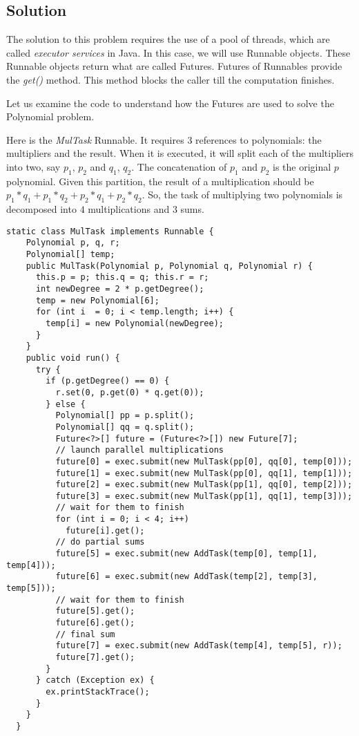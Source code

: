 \subsection{Solution}
\par
The solution to this problem requires the use of a pool of threads, which are
called \textit{executor services} in Java.  In this case, we will use Runnable
objects. These Runnable objects return what are called Futures. Futures of
Runnables provide the \textit{get()} method. This method blocks the caller till
the computation finishes. 
\par
Let us examine the code to understand how the Futures are used to solve the
Polynomial problem.
\par
Here is the \textit{MulTask} Runnable. It requires 3 references to polynomials:
the multipliers and the result. When it is executed, it will split each of the
multipliers into two, say $p_1$, $p_2$ and $q_1$, $q_2$. The concatenation of
$p_1$ and $p_2$ is the original $p$ polynomial. Given this partition, the result
of a multiplication should be $p_1*q_1 + p_1*q_2 + p_2*q_1 + p_2*q_2$. So, the
task of multiplying two polynomials is decomposed into $4$ multiplications and
$3$ sums. 
\par
\hfill
\begin{lstlisting}[style=numbers]
  static class MulTask implements Runnable {
    Polynomial p, q, r;
    Polynomial[] temp;
    public MulTask(Polynomial p, Polynomial q, Polynomial r) {
      this.p = p; this.q = q; this.r = r;
      int newDegree = 2 * p.getDegree();
      temp = new Polynomial[6];
      for (int i  = 0; i < temp.length; i++) {
        temp[i] = new Polynomial(newDegree);
      }
    }
    public void run() {
      try {
        if (p.getDegree() == 0) {
          r.set(0, p.get(0) * q.get(0));
        } else {
          Polynomial[] pp = p.split();
          Polynomial[] qq = q.split();
          Future<?>[] future = (Future<?>[]) new Future[7];
          // launch parallel multiplications
          future[0] = exec.submit(new MulTask(pp[0], qq[0], temp[0]));
          future[1] = exec.submit(new MulTask(pp[0], qq[1], temp[1]));
          future[2] = exec.submit(new MulTask(pp[1], qq[0], temp[2]));
          future[3] = exec.submit(new MulTask(pp[1], qq[1], temp[3]));
          // wait for them to finish
          for (int i = 0; i < 4; i++)
            future[i].get();
          // do partial sums
          future[5] = exec.submit(new AddTask(temp[0], temp[1], temp[4]));
          future[6] = exec.submit(new AddTask(temp[2], temp[3], temp[5]));
          // wait for them to finish
          future[5].get();
          future[6].get();
          // final sum
          future[7] = exec.submit(new AddTask(temp[4], temp[5], r));
          future[7].get();
        }
      } catch (Exception ex) {
        ex.printStackTrace();
      }
    }
  }
\end{lstlisting}
